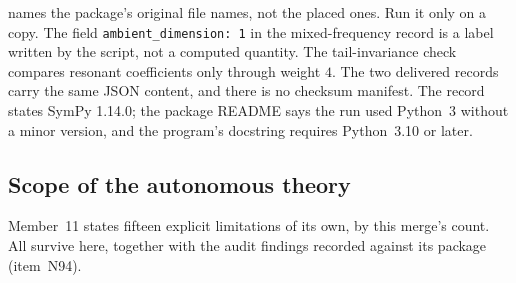 \documentclass[11pt,letterpaper]{article}
\numberwithin{equation}{section}
\theoremstyle{definition}
\theoremstyle{remark}
\begin{document}
\begin{enumerate}[label=\textup{N\arabic*.},leftmargin=3.0em,itemsep=0.35em,start=65]
names the package's original file names, not the placed ones. Run it only on a
copy. The field \texttt{ambient\_dimension: 1} in the mixed-frequency record is a
label written by the script, not a computed quantity. The tail-invariance check
compares resonant coefficients only through weight $4$. The two delivered records
carry the same JSON content, and there is no checksum manifest. The record states
SymPy 1.14.0; the package README says the run used Python~3 without a minor
version, and the program's docstring requires Python~3.10 or later.
\end{enumerate}

\subsection{Scope of the autonomous theory}
\label{diff:aut:sub:nc}

Member~11 states fifteen explicit limitations of its own, by this merge's count.
All survive here, together with the audit findings recorded against its package
(item~N94).
\end{document}
